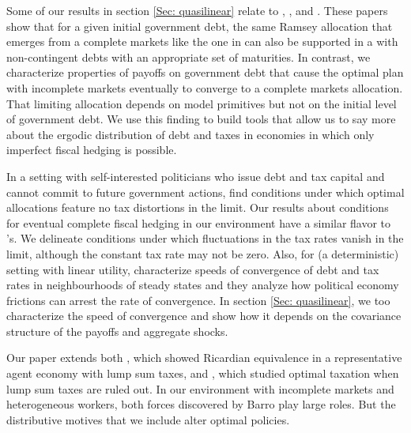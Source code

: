 \documentclass[thmsb,11pt]{article}
\begin{document}
Some of our results in section \ref{Sec: quasilinear}  
relate to \citet{Angeletos}, \citet{Buera_Nicolini}, and \citet{Shin2007}. 
These papers show that for a given initial government  debt, the same Ramsey allocation that emerges from a complete markets  like the
one in \citet{LucasJr.1983} can also be supported in a with non-contingent debts with an appropriate set of  maturities.
In contrast, we characterize properties of payoffs on government debt that cause the optimal plan with incomplete markets   eventually to
converge to a  complete markets allocation. That limiting allocation depends on  model primitives but  not on the initial level of
government debt. We use this finding to build tools that allow us to say more about the ergodic distribution of debt and taxes
in economies in which only imperfect fiscal hedging is possible. 

In a setting with self-interested politicians   who issue debt and tax capital and cannot commit to future government actions,
\citet{AA2011} find conditions under which optimal allocations feature no tax distortions in the limit. Our
 results about conditions for eventual complete fiscal hedging in our environment   have a similar flavor to \citeauthor{AA2011}'s. 
 We delineate conditions under which  fluctuations in the  tax  rates vanish in the limit, 
although the constant tax rate may not be zero. Also, for (a deterministic) setting with linear utility, \citeauthor{AA2011} characterize speeds of
convergence of debt and tax rates in  neighbourhoods of steady states and they analyze how  political economy frictions can arrest the rate of convergence.
In section \ref{Sec: quasilinear}, %
we too characterize the speed of convergence  and show how it depends on the
covariance structure of the payoffs and aggregate shocks.  


Our paper extends both \citet{Barro1974}, which showed Ricardian equivalence in a representative agent economy with lump sum taxes,
and \citet{Barro1979}, which studied  optimal taxation  when lump sum taxes are ruled out. In our environment with incomplete markets and heterogeneous workers,
both forces discovered by Barro play large roles.  But the distributive motives that we include alter optimal policies.
\end{document}
